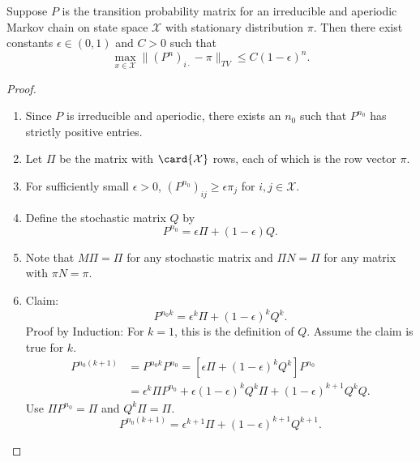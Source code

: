 \documentclass[12pt]{article}
\begin{document}
\begin{theorem}
    Suppose \( P \) is the transition probability matrix for an
    irreducible and aperiodic Markov chain on state space \( \mathcal{X}
    \) with stationary distribution \( \pi \).  Then there exist
    constants \( \epsilon \in (0,1) \) and \( C > 0 \) such that
    \[
        \max_{x \in \mathcal{X}} \| (P^n)_{i \cdot} - \pi \|_{TV} \le C
        (1-\epsilon)^n.
    \]
\end{theorem}

\begin{proof}
    \begin{enumerate}
        \item
            Since \( P \) is irreducible and aperiodic, there exists an \(
            n_0 \) such that \( P^{n_0} \) has strictly positive
            entries.
        \item
            Let \( \Pi \) be the matrix with \( \card{\mathcal{X}} \)
            rows, each of which is the row vector \( \pi \).
        \item
            For sufficiently small \( \epsilon > 0 \), \( (P^{n_0})_{ij}
            \ge \epsilon \pi_{j} \) for \( i,j \in \mathcal{X} \).
        \item
            Define the stochastic matrix \( Q \) by
            \[
                P^{n_0} = \epsilon\Pi + (1-\epsilon) Q.
            \]
        \item
            Note that \( M \Pi = \Pi \) for any stochastic matrix and \(
            \Pi N =\Pi \) for any matrix with \( \pi N = \pi \).
        \item
            Claim:
            \[
                P^{n_0 k} = \epsilon^k \Pi + (1-\epsilon)^k Q^k.
            \] Proof by Induction:  For \( k=1 \), this is the
            definition of \( Q \).  Assume the claim is true for \( k \).
            \begin{align*}
                P^{n_0(k+1)} &= P^{n_0 k} P^{n_0} = [\epsilon\Pi + (1-\epsilon)^k
                Q^k]P^{n_0} \\
                &= \epsilon^k\Pi P^{n_0} + \epsilon (1-\epsilon)^k Q^k
                \Pi + (1-\epsilon)^{k+1} Q^k Q.
            \end{align*}
            Use \( \Pi P^{n_0} = \Pi \) and \( Q^k \Pi = \Pi \).
            \[
                P^{n_0(k+1)} = \epsilon^{k+1} \Pi + (1-\epsilon)^{k+1} Q^
                {k+1}.
\]
\end{enumerate}
\end{proof}
\end{document}
